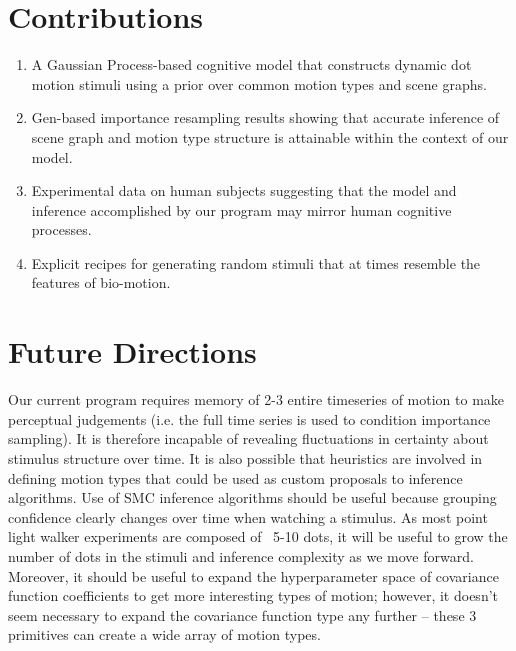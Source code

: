 \documentclass{scrartcl}
\begin{document}
\section{Contributions}

\begin{enumerate}
  \item A Gaussian Process-based cognitive model that constructs dynamic dot motion stimuli using a prior over common motion types and scene graphs. \cite{Saad_2019}
  \item Gen-based importance resampling results showing that accurate inference of scene graph and motion type structure is attainable within the context of our model. 
  \item Experimental data on human subjects suggesting that the model and inference accomplished by our program may mirror human cognitive processes.
  \item Explicit recipes for generating random stimuli that at times resemble the features of bio-motion.
\end{enumerate}    


\section{Future Directions}

Our current program requires memory of 2-3 entire timeseries of motion to make perceptual judgements (i.e. the full time series is used to condition importance sampling). It is therefore incapable of revealing fluctuations in certainty about stimulus structure over time. It is also possible that heuristics are involved in defining motion types that could be used as custom proposals to inference algorithms. Use of SMC inference algorithms should be useful because grouping confidence clearly changes over time when watching a stimulus. As most point light walker experiments are composed of ~5-10 dots, it will be useful to grow the number of dots in the stimuli and inference complexity as we move forward. Moreover, it should be useful to expand the hyperparameter space of covariance function coefficients to get more interesting types of motion; however, it doesn't seem necessary to expand the covariance function type any further -- these 3 primitives can create a wide array of motion types. 



\end{document}
